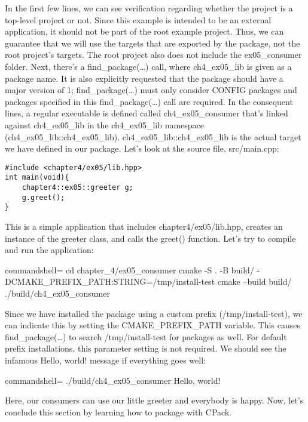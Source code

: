 In the first few lines, we can see verification regarding whether the project is a top-level project or not. Since this example is intended to be an external application, it should not be part of the root example project. Thus, we can guarantee that we will use the targets that are exported by the package, not the root project's targets. The root project also does not include the ex05\_consumer folder. Next, there's a find\_package(…) call, where ch4\_ex05\_lib is given as a package name. It is also explicitly requested that the package should have a major version of 1; find\_package(…) must only consider CONFIG packages and packages specified in this find\_package(…) call are required. In the consequent lines, a regular executable is defined called ch4\_ex05\_consumer that's linked against ch4\_ex05\_lib in the ch4\_ex05\_lib namespace (ch4\_ex05\_lib::ch4\_ex05\_lib). ch4\_ex05\_lib::ch4\_ex05\_lib is the actual target we have defined in our package. Let's look at the source file, src/main.cpp:

\begin{lstlisting}[style=styleCXX]
#include <chapter4/ex05/lib.hpp>
int main(void){
	chapter4::ex05::greeter g;
	g.greet();
}
\end{lstlisting}

This is a simple application that includes chapter4/ex05/lib.hpp, creates an instance of the greeter class, and calls the greet() function. Let's try to compile and run the application:

\begin{tcblisting}{commandshell={}}
cd chapter_4/ex05_consumer
cmake -S . -B build/ -DCMAKE_PREFIX_PATH:STRING=/tmp/install-test
cmake --build build/
./build/ch4_ex05_consumer
\end{tcblisting}

Since we have installed the package using a custom prefix (/tmp/install-test), we can indicate this by setting the CMAKE\_PREFIX\_PATH variable. This causes find\_package(…) to search /tmp/install-test for packages as well. For default prefix installations, this parameter setting is not required. We should see the infamous Hello, world! message if everything goes well: 

\begin{tcblisting}{commandshell={}}
./build/ch4_ex05_consumer
Hello, world!
\end{tcblisting}

Here, our consumers can use our little greeter and everybody is happy. Now, let's conclude this section by learning how to package with CPack.



























